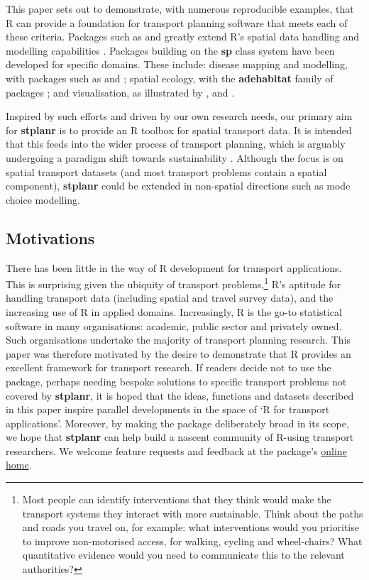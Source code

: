 This paper sets out to demonstrate, with numerous reproducible examples, that
R can provide a foundation for transport planning software that meets
each of these criteria. Packages such as 
\citep{pebesma_classes_2005} and 
\citep{bivand_rgeos:_2016} greatly extend R's spatial data handling and
modelling capabilities \citep{bivand_applied_2013}. Packages building on
the \textbf{sp} class system have been developed for specific domains.
These include: disease mapping and modelling, with packages such as  and  \citep{kim_spatialepi:_2016,brown_diseasemapping:_2016}; spatial ecology, with the \textbf{adehabitat} family of packages \citep{calenge_package_2006};
and visualisation, as illustrated by ,  and .

Inspired by such efforts and driven by our own research needs, our
primary aim for \textbf{stplanr} is to provide an R toolbox for
spatial transport data.
It is intended that this feeds into the wider process of transport planning, which is arguably undergoing a paradigm shift towards sustainability \citep{banister_sustainable_2008}.
Although the focus is on spatial transport datasets
(and most transport problems contain a spatial component),
\textbf{stplanr} could be extended in non-spatial directions such as mode
choice modelling.

\subsection{Motivations}\label{motivations}

There has been little in the way of R development for transport
applications. This is surprising given the ubiquity of transport
problems,\footnote{Most people can identify interventions that they
  think would make the transport systems they interact with more
  sustainable. Think about the paths and roads you travel on, for
  example: what interventions would you prioritise to improve
  non-motorised access, for walking, cycling and wheel-chairs? What
  quantitative evidence would you need to communicate this to the
  relevant authorities?} R's aptitude for handling transport data
(including spatial and travel survey data), and the increasing use of R
in applied domains. Increasingly, R is the go-to statistical software in
many organisations: academic, public sector and privately owned. Such
organisations undertake the majority of transport planning research.
This paper was therefore motivated by the desire to demonstrate that R
provides an excellent framework for transport research. If readers
decide not to use the package, perhaps needing bespoke solutions to
specific transport problems not covered by \textbf{stplanr}, it is hoped
that the ideas, functions and datasets described in this paper inspire
parallel developments in the space of `R for transport applications'.
Moreover, by making the package deliberately broad in its scope, we hope
that \textbf{stplanr} can help build a nascent community of R-using
transport researchers. We welcome feature requests and feedback at the
package's \href{https://github.com/ropensci/stplanr/issues}{online
home}.


